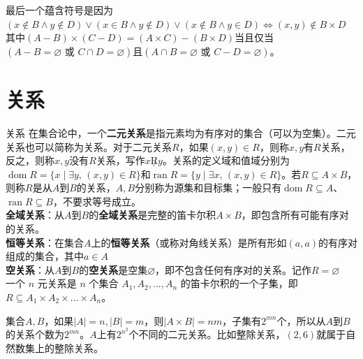 \documentclass[lang=cn,11pt]{elegantbook}
\begin{document}
最后一个蕴含符号是因为$(x \notin B \land y \notin D)\lor(x \in B \land y \notin D)\lor(x \notin B \land y \in D)\Leftrightarrow (x,y) \notin B \times D$\\
其中$(A-B)\times(C-D)=(A\times C)-(B\times D)$当且仅当$(A-B=\varnothing\text{ 或 }C\cap D=\varnothing)$且$(A\cap B=\varnothing\text{ 或 }C-D=\varnothing)$。
\section{关系}
\begin{definition}{关系}
在集合论中，一个\textbf{二元关系}是指元素均为有序对的集合（可以为空集）。二元关系也可以简称为关系。对于二元关系$R$，如果$(x,y)\in R$，则称$x,y$有$R$关系，反之，则称$x,y$没有$R$关系，写作$x\not Ry$。关系的定义域和值域分别为$\operatorname{dom}R=\{x\mid\exists y,\,(x,y)\in R\}$和$\operatorname{ran}R=\{y\mid\exists x,\,(x,y)\in R\}$。若$R\subseteq A\times B$，则称$R$是从$A$到$B$的关系，$A,B$分别称为源集和目标集；一般只有$\operatorname{dom}R\subseteq A$、$\operatorname{ran}R\subseteq B$，不要求等号成立。\\
\textbf{全域关系}：从$A$到$B$的\textbf{全域关系}是完整的笛卡尔积$A \times B$，即包含所有可能有序对的关系。\\
\textbf{恒等关系}：在集合$A$上的\textbf{恒等关系}（或称对角线关系）是所有形如$(a,a)$的有序对组成的集合，其中$a \in A$\\
\textbf{空关系}：从$A$到$B$的\textbf{空关系}是空集$\varnothing$，即不包含任何有序对的关系。记作$R = \varnothing$\\
一个 $n$ 元关系是 $n$ 个集合 $A_1, A_2, \dots, A_n$ 的笛卡尔积的一个子集，即 $R \subseteq A_1 \times A_2 \times \dots \times A_n$。
\end{definition}
集合$A,B$，如果$|A|=n,|B|=m$，则$|A\times B|=nm$，子集有$2^{mn}$个，所以从$A$到$B$的关系个数为$2^{mn}$。$A$上有$2^{n^2}$个不同的二元关系。比如整除关系，$(2,6)$就属于自然数集上的整除关系。
\end{document}

